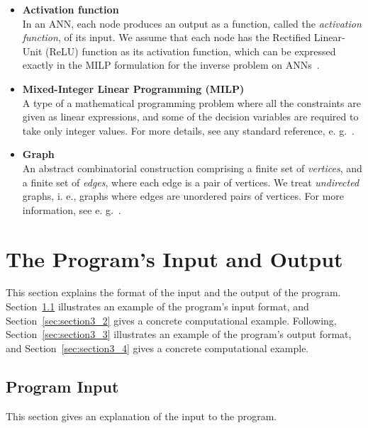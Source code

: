 \documentclass[11pt, titlepage, dvipdfmx, twoside]{article}
\begin{document}
\begin{itemize}
\item {\bf Activation function}\\
%
In an ANN, each node produces an output as a function, called the \emph{activation function}, 
of its input.
We assume that each node has the Rectified Linear-Unit (ReLU) function 
as its activation function,
which can be expressed exactly in the MILP formulation
for the inverse problem on ANNs~\cite{AN19}.

\item {\bf Mixed-Integer Linear Programming (MILP)}\\
%
A type of a mathematical programming problem
where all the constraints are given as linear expressions, and
some of the decision variables are required to take
only integer values.
For more details, see any standard reference, e. g.~\cite{LP}.


\item {\bf Graph} \\
An abstract combinatorial construction comprising
a finite set of {\em vertices}, and a finite set of {\em edges},
where each edge is a pair of vertices.
We treat {\em undirected} graphs,
i. e., graphs where edges are unordered pairs of vertices.
For more information, see e. g.~\cite{graph}.

\end{itemize}


\section{The Program's Input and Output}
\label{sec:InOut}

This section explains the format of the input and the output of the program.
Section~\ref{sec:section3_1} illustrates an example of the program's input format,
and Section~\ref{sec:section3_2} gives a concrete computational example.
Following, Section~\ref{sec:section3_3} illustrates an example of the program's output format,
and Section~\ref{sec:section3_4} gives a concrete computational example.


\subsection{Program Input}
\label{sec:section3_1}

This section gives an explanation of the input to the program.
\end{document}
